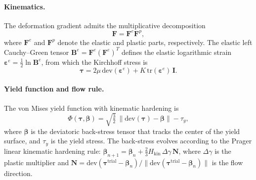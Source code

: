 \documentclass[sort&compress]{svjour3} %
\begin{document}
\paragraph{Kinematics.}
The deformation gradient admits the multiplicative decomposition
\begin{equation}
\mathbf{F} = \mathbf{F}^e \mathbf{F}^p,
\label{eq:ep_multiplicative}
\end{equation}
where $\mathbf{F}^e$ and $\mathbf{F}^p$ denote the elastic and plastic parts, respectively. The elastic left Cauchy--Green tensor $\mathbf{B}^e = \mathbf{F}^e (\mathbf{F}^e)^T$ defines the elastic logarithmic strain $\boldsymbol{\varepsilon}^e = \tfrac{1}{2}\ln \mathbf{B}^e$, from which the Kirchhoff stress is
\begin{equation}
\boldsymbol{\tau} = 2\mu\,\mathrm{dev}(\boldsymbol{\varepsilon}^e) + K\,\mathrm{tr}(\boldsymbol{\varepsilon}^e)\,\mathbf{I}.
\label{eq:kirchhoff_stress}
\end{equation}

\paragraph{Yield function and flow rule.}
The von Mises yield function with kinematic hardening is
\begin{equation}
\Phi(\boldsymbol{\tau},\boldsymbol{\beta}) = \sqrt{\tfrac{3}{2}}\,\left\|\mathrm{dev}(\boldsymbol{\tau}) - \boldsymbol{\beta}\right\| - \tau_y,
\label{eq:von_mises_yield}
\end{equation}
where $\boldsymbol{\beta}$ is the deviatoric back-stress tensor that tracks the center of the yield surface, and $\tau_y$ is the yield stress. The back-stress evolves according to the Prager linear kinematic hardening rule: $\boldsymbol{\beta}_{n+1} = \boldsymbol{\beta}_n + \tfrac{2}{3}H_{\mathrm{kin}}\,\Delta\gamma\,\mathbf{N}$, where $\Delta\gamma$ is the plastic multiplier and $\mathbf{N} = \mathrm{dev}(\boldsymbol{\tau}^{\mathrm{trial}} - \boldsymbol{\beta}_n)/\|\mathrm{dev}(\boldsymbol{\tau}^{\mathrm{trial}} - \boldsymbol{\beta}_n)\|$ is the flow direction.
\end{document}
